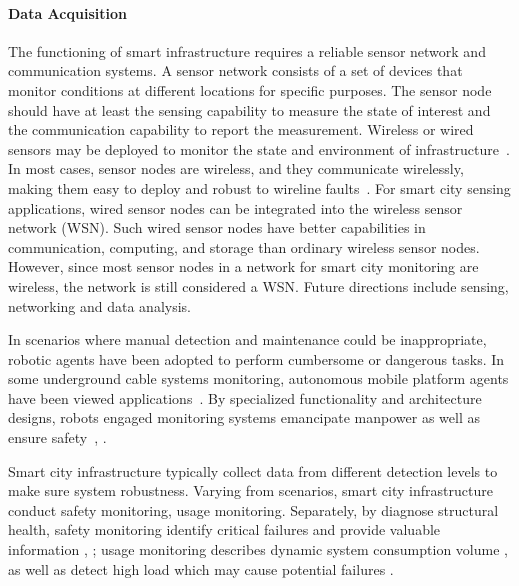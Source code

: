 \documentclass[letterpaper, twocolumn, 10pt, conference]{IEEEtran}
\begin{document}
\paragraph{Data Acquisition}



The functioning of smart infrastructure requires a reliable sensor network and communication systems. A sensor network consists of a set of devices that monitor conditions at different locations for specific purposes. The sensor node should have at least the sensing capability to measure the state of interest and the communication capability to report the measurement. Wireless or wired sensors may be deployed to monitor the state and environment of infrastructure~\cite{Yun2011}. In most cases, sensor nodes are wireless, and they communicate wirelessly, making them easy to deploy and robust to wireline faults~\cite{bensaleh2013review}. For smart city sensing applications, wired sensor nodes can be integrated into the wireless sensor network (WSN). Such wired sensor nodes have better capabilities in communication, computing, and storage than ordinary wireless sensor nodes. However, since most sensor nodes in a network for smart city monitoring are wireless, the network is still considered a WSN. Future directions include sensing, networking and data analysis.

In scenarios where manual detection and maintenance could be inappropriate, robotic agents have been adopted to perform cumbersome or dangerous tasks. In some underground cable systems monitoring, autonomous mobile platform agents have been viewed applications~\cite{robotic_cable_detection}. By specialized functionality and architecture designs, robots engaged monitoring systems emancipate manpower as well as ensure safety~\cite{BAK2004125}, \cite{robotic_cable_detection}. 

Smart city infrastructure typically collect data from different detection levels to make sure system robustness. Varying from scenarios, smart city infrastructure conduct safety monitoring, usage monitoring. Separately, by diagnose structural health, safety monitoring identify critical failures and provide valuable information \cite{farrar2006introduction}, \cite{kim2007health}; usage monitoring describes dynamic system consumption volume \cite{SIANO2014461}, \cite{10.1007/978-3-319-98827-6_9} as well as detect high load which may cause potential failures \cite{JACOB20109}. 
\end{document}
